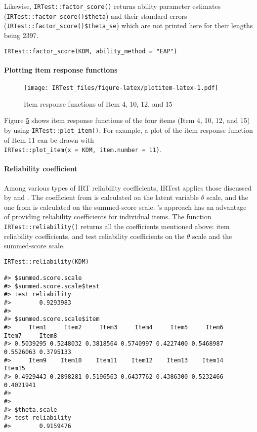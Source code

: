 Likewise, \texttt{IRTest::factor\_score()} returns ability parameter estimates
(\texttt{IRTest::factor\_score()\$theta}) and their standard errors
(\texttt{IRTest::factor\_score()\$theta\_se}) which are not printed here for their
lengths being 2397.

\begin{verbatim}
IRTest::factor_score(KDM, ability_method = "EAP")
\end{verbatim}

\hypertarget{plotting-item-response-functions}{%
\paragraph{Plotting item response functions}\label{plotting-item-response-functions}}

\begin{figure}
\hypertarget{fig:plotitem-latex}{%
\centering
\texttt{[image: IRTest\_files/figure-latex/plotitem-latex-1.pdf]}
\caption{Item response functions of Item 4, 10, 12, and
15}\label{fig:plotitem-latex}
}
\end{figure}

Figure \protect\hyperlink{fig:plotitem-latex}{5} shows item response functions of the
four items (Item 4, 10, 12, and 15) by using \texttt{IRTest::plot\_item()}. For
example, a plot of the item response function of Item 11 can be drawn
with \texttt{IRTest::plot\_item(x~=~KDM,~item.number~=~11)}.

\hypertarget{reliability-coefficient}{%
\paragraph{Reliability coefficient}\label{reliability-coefficient}}

Among various types of IRT reliability coefficients, IRTest applies
those discussed by \citet{Green:1984} and \citet{May+Nicewander:1994}. The coefficient
from \citet{Green:1984} is calculated on the latent variable \(\theta\) scale,
and the one from \citet{May+Nicewander:1994} is calculated on the summed-score
scale. \citet{May+Nicewander:1994}'s approach has an advantage of providing
reliability coefficients for individual items. The function
\texttt{IRTest::reliability()} returns all the coefficients mentioned above:
item reliability coefficients, and test reliability coefficients on the
\(\theta\) scale and the summed-score scale.

\begin{verbatim}
IRTest::reliability(KDM)

#> $summed.score.scale
#> $summed.score.scale$test
#> test reliability 
#>        0.9293983 
#> 
#> $summed.score.scale$item
#>     Item1     Item2     Item3     Item4     Item5     Item6     Item7     Item8 
#> 0.5039295 0.5248032 0.3818564 0.5740997 0.4227400 0.5468987 0.5526063 0.3795133 
#>     Item9    Item10    Item11    Item12    Item13    Item14    Item15 
#> 0.4929443 0.2898281 0.5196563 0.6437762 0.4386300 0.5232466 0.4021941 
#> 
#> 
#> $theta.scale
#> test reliability 
#>        0.9159476
\end{verbatim}

